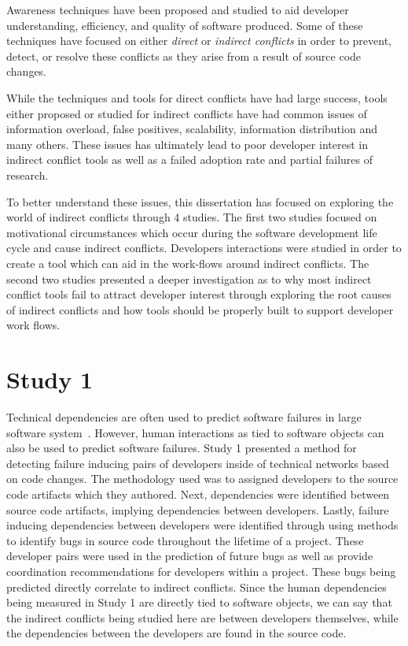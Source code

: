 \label{concl}

Awareness techniques have been proposed and studied to aid developer
understanding, efficiency, and quality of software produced. Some of these techniques have focused 
on either \textit{direct} or \textit{indirect conflicts} in order to prevent, detect, or resolve these conflicts as 
they arise from a result of source code changes. 

While the techniques and tools for direct conflicts have had large success, tools either proposed or studied for 
indirect conflicts have had common issues of information overload, false positives, scalability, information distribution 
and many others. These issues has ultimately lead to poor developer interest in indirect conflict tools as well
as a failed adoption rate and partial failures of research.

To better understand these issues, this dissertation has focused on exploring the world of indirect 
conflicts through 4 studies. The first two studies focused on motivational circumstances which occur during 
the software development life cycle and cause indirect conflicts. Developers interactions were studied in order to create 
a tool which can aid in the work-flows around indirect conflicts. The second two studies presented a deeper investigation 
as to why most indirect conflict tools fail to attract developer interest through exploring the root causes of indirect conflicts 
and how tools should be properly built to support developer work flows.

\section{Study 1}

Technical dependencies are often used to predict software failures
in large software system~\cite{Pinzger:2008:DNP, Zimmermann:2008:PDU, Kim:2006:AIB}. However, human interactions as tied
to software objects can also be used to predict software failures.
Study 1 presented a method for detecting failure inducing pairs of developers inside
of technical networks based on code changes. The methodology used was to assigned developers to the source code artifacts
which they authored. Next, dependencies were identified between source code artifacts, implying dependencies between
developers. Lastly, failure inducing dependencies between developers were identified through using methods to identify
bugs in source code throughout the lifetime of a project. These developer pairs were used in the prediction
of future bugs as well as provide coordination recommendations for developers within a project. These bugs being predicted
directly correlate to indirect conflicts. Since the human dependencies being measured in Study 1 are directly tied to
software objects, we can say that the indirect conflicts being studied here are between developers themselves, while
the dependencies between the developers are found in the source code.

